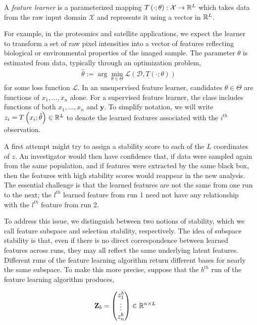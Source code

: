 \begin{definition}
A \textit{feature learner} is a parameterized mapping $T\left(\cdot;
\theta\right): \mathcal{X} \to \mathbb{R}^{L}$ which takes data from the raw input
domain $\mathcal{X}$ and represents it using a vector in $\mathbb{R}^{L}$.
\end{definition}

For example, in the proteomics and satellite applications, we expect the learner
to transform a set of raw pixel intensities into a vector of features reflecting
biological or environmental properties of the imaged sample. The parameter
$\theta$ is estimated from data, typically through an optimization problem,
\begin{align*}
  \hat{\theta} := \arg\min_{\theta \in \Theta} \mathcal{L}\left(\mathcal{D}, T\left(\cdot; \theta\right)\right)
\end{align*}
for some loss function $\mathcal{L}$. In an unsupervised feature learner,
candidates $\theta \in \Theta$ are functions of $x_{1}, \dots, x_{n}$ alone. For
a supervised feature learner, the class includes functions of both
$x_{1}, \dots, x_{n}$ and $\mathbf{y}$. To simplify notation, we will write
$z_{i} = T\left(x_{i}; \hat{\theta}\right) \in
\mathbb{R}^{L}$ to denote the learned features associated with the $i^{th}$
observation.

A first attempt might try to assign a stability score to each of the $L$
coordinates of $z$. An investigator would then have confidence that, if data
were sampled again from the same population, and if features were extracted by
the same black box, then the features with high stability scores would reappear
in the new analysis. The essential challenge is that the learned features are
not the same from one run to the next; the $l^{th}$ learned feature from run 1
need not have any relationship with the $l^{th}$ feature from run 2.

To address this issue, we distinguish between two notions of stability, which we
call feature subspace and selection stability, respectively. The idea of
subspace stability is that, even if there is no direct correspondence between
learned features across runs, they may all reflect the same underlying latent
features. Different runs of the feature learning algorithm return different
bases for nearly the same subspace. To make this more precise, suppose that the
$b^{th}$ run of the feature learning algorithm produces,

\begin{align}
\mathbf{Z}_{b} &= \begin{pmatrix}
z^{b}_{1} \\
\vdots \\
z^{b}_{n}
\end{pmatrix} \in \mathbb{R}^{n \times L}
\end{align}

